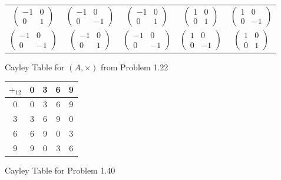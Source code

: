 \documentclass{amsbook}
\begin{document}
\begin{figure}[t]
\begin{tabular}{c|cccc}
				$\begin{pmatrix} -1 & 0 \\ 0 & 1 \end{pmatrix}$ & $\begin{pmatrix} -1 & 0 \\ 0 & -1 \end{pmatrix}$ & $\begin{pmatrix} -1 & 0 \\ 0 & 1 \end{pmatrix}$ & \color{red}$\begin{pmatrix} 1 & 0 \\ 0 & 1 \end{pmatrix}$\color{black} & $\begin{pmatrix} 1 & 0 \\ 0 & -1 \end{pmatrix}$ \\
				$\begin{pmatrix} -1 & 0 \\ 0 & -1 \end{pmatrix}$ & $\begin{pmatrix} -1 & 0 \\ 0 & 1 \end{pmatrix}$ & $\begin{pmatrix} -1 & 0 \\ 0 & -1 \end{pmatrix}$ & $\begin{pmatrix} 1 & 0 \\ 0 & -1 \end{pmatrix}$ & \color{red}$\begin{pmatrix} 1 & 0 \\ 0 & 1 \end{pmatrix}$ \color{black}
			\end{tabular}
			\caption{Cayley Table for $(A, \times)$ from Problem 1.22}
			\label{122CT}
		\end{figure}

		\begin{figure}[h]
			\begin{tabular}{c|cccc}
				$+_{12}$ & 0 & 3 & 6 & 9 \\
				\hline
				0 & \color{red} 0 \color{black} & 3 & 6 & 9 \\
				3 & 3 & 6 & 9 & \color{red} 0 \color{black} \\
				6 & 6 & 9 & \color{red} 0 \color{black} & 3 \\
				9 & 9 & \color{red} 0 \color{black} & 3 & 6
			\end{tabular}
			\caption{Cayley Table for Problem 1.40}
			\label{140CT}
		\end{figure}
\end{document}
